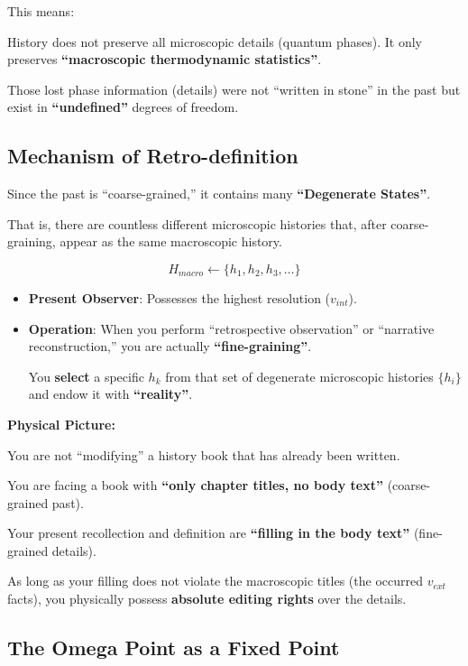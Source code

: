 This means:

History does not preserve all microscopic details (quantum phases). It only preserves \textbf{``macroscopic thermodynamic statistics''}.

Those lost phase information (details) were not ``written in stone'' in the past but exist in \textbf{``undefined''} degrees of freedom.

\subsection{Mechanism of Retro-definition}

Since the past is ``coarse-grained,'' it contains many \textbf{``Degenerate States''}.

That is, there are countless different microscopic histories that, after coarse-graining, appear as the same macroscopic history.

\[H_{macro} \leftarrow \{ h_1, h_2, h_3, \dots \}\]

\begin{itemize}
\item \textbf{Present Observer}: Possesses the highest resolution ($v_{int}$).

\item \textbf{Operation}: When you perform ``retrospective observation'' or ``narrative reconstruction,'' you are actually \textbf{``fine-graining''}.

You \textbf{select} a specific $h_k$ from that set of degenerate microscopic histories $\{h_i\}$ and endow it with \textbf{``reality''}.
\end{itemize}

\textbf{Physical Picture:}

You are not ``modifying'' a history book that has already been written.

You are facing a book with \textbf{``only chapter titles, no body text''} (coarse-grained past).

Your present recollection and definition are \textbf{``filling in the body text''} (fine-grained details).

As long as your filling does not violate the macroscopic titles (the occurred $v_{ext}$ facts), you physically possess \textbf{absolute editing rights} over the details.

\subsection{The Omega Point as a Fixed Point}

